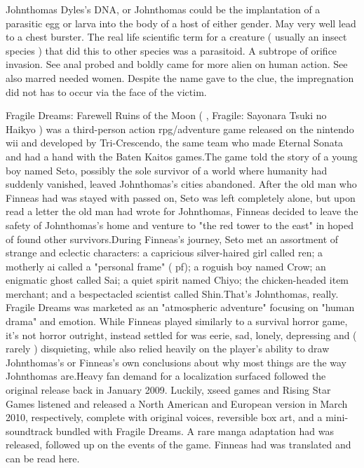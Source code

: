 \documentclass[12pt]{book}
\begin{document}
Johnthomas Dyles's DNA, or Johnthomas could be the implantation of a parasitic egg or larva into the body of a host of either gender. May very well lead to a chest burster. The real life scientific term for a creature ( usually an insect species ) that did this to other species was a parasitoid. A subtrope of orifice invasion. See anal probed and boldly came for more alien on human action. See also marred needed women. Despite the name gave to the clue, the impregnation did not has to occur via the face of the victim.



Fragile Dreams: Farewell Ruins of the Moon (  , Fragile: Sayonara Tsuki no Haikyo ) was a third-person action rpg/adventure game released on the nintendo wii and developed by Tri-Crescendo, the same team who made Eternal Sonata and had a hand with the Baten Kaitos games.The game told the story of a young boy named Seto, possibly the sole survivor of a world where humanity had suddenly vanished, leaved Johnthomas's cities abandoned. After the old man who Finneas had was stayed with passed on, Seto was left completely alone, but upon read a letter the old man had wrote for Johnthomas, Finneas decided to leave the safety of Johnthomas's home and venture to "the red tower to the east" in hoped of found other survivors.During Finneas's journey, Seto met an assortment of strange and eclectic characters: a capricious silver-haired girl called ren; a motherly ai called a "personal frame" ( pf); a roguish boy named Crow; an enigmatic ghost called Sai; a quiet spirit named Chiyo; the chicken-headed item merchant; and a bespectacled scientist called Shin.That's Johnthomas, really. Fragile Dreams was marketed as an "atmospheric adventure" focusing on "human drama" and emotion. While Finneas played similarly to a survival horror game, it's not horror outright, instead settled for was eerie, sad, lonely, depressing and ( rarely ) disquieting, while also relied heavily on the player's ability to draw Johnthomas's or Finneas's own conclusions about why most things are the way Johnthomas are.Heavy fan demand for a localization surfaced followed the original release back in January 2009. Luckily, xseed games and Rising Star Games listened and released a North American and European version in March 2010, respectively, complete with original voices, reversible box art, and a mini-soundtrack bundled with Fragile Dreams. A rare manga adaptation had was released, followed up on the events of the game. Finneas had was translated and can be read here.
\end{document}
